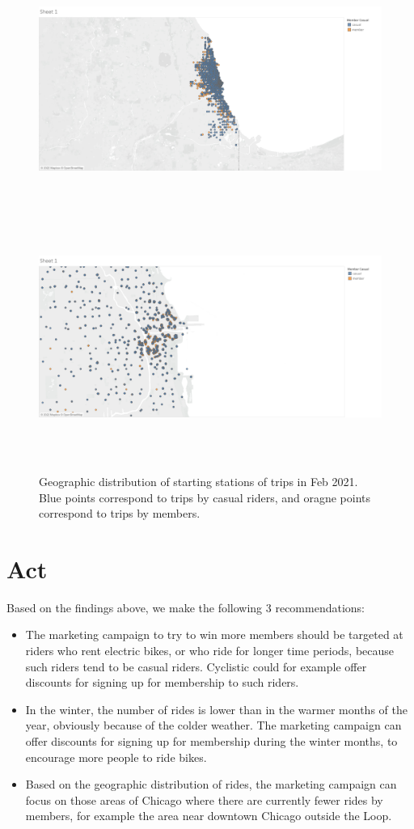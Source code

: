 \documentclass[11pt,twoside]{article}
\theoremstyle{plain}
\theoremstyle{definition}
\theoremstyle{remark}
\begin{document}
\begin{center}
\begin{figure}
\includegraphics[width=15cm, height=8cm]{Sheet 1}
\includegraphics[width=15cm, height=8cm]{Sheet 2}
\caption{Geographic distribution of starting stations of trips in Feb 2021. Blue points correspond to trips by casual riders, and oragne points correspond to trips by members.}
\end{figure}
\end{center}

\section{Act}
Based on the findings above, we make the following 3 recommendations:
\begin{itemize}
    \item The marketing campaign to try to win more members should be targeted at riders who rent electric bikes, or who ride for longer time periods, because such riders tend to be casual riders. Cyclistic could for example offer discounts for signing up for membership to such riders.
    \item In the winter, the number of rides is lower than in the warmer months of the year, obviously because of the colder weather. The marketing campaign can offer discounts for signing up for membership during the winter months, to encourage more people to ride bikes.
    \item Based on the geographic distribution of rides, the marketing campaign can focus on those areas of Chicago where there are currently fewer rides by members, for example the area near downtown Chicago outside the Loop.
\end{itemize}
\end{document}
